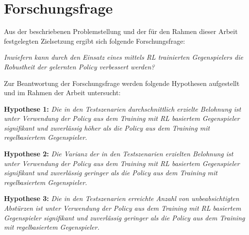 \section{Forschungsfrage}

Aus der beschriebenen Problemstellung und der für den Rahmen dieser Arbeit festgelegten Zielsetzung ergibt sich folgende Forschungsfrage: 

\textit{Inwiefern kann durch den Einsatz eines mittels RL trainierten Gegenspielers die Robustheit der gelernten Policy verbessert werden?}

Zur Beantwortung der Forschungsfrage werden folgende Hypothesen aufgestellt und im Rahmen der Arbeit untersucht:

\textbf{Hypothese 1:}
\textit{Die in den Testszenarien durchschnittlich erzielte Belohnung ist unter Verwendung der Policy aus dem Training mit RL basiertem Gegenspieler signifikant und zuverlässig höher als die Policy aus dem Training mit regelbasiertem Gegenspieler.}

\textbf{Hypothese 2:}
\textit{Die Varianz der in den Testszenarien erzielten Belohnung ist unter Verwendung der Policy aus dem Training mit RL basiertem Gegenspieler signifikant und zuverlässig geringer als die Policy aus dem Training mit regelbasiertem Gegenspieler.}

\textbf{Hypothese 3:}
\textit{Die in den Testszenarien erreichte Anzahl von unbeabsichtigten Abstürzen ist unter Verwendung der Policy aus dem Training mit RL basiertem Gegenspieler signifikant und zuverlässig geringer als die Policy aus dem Training mit regelbasiertem Gegenspieler.}

